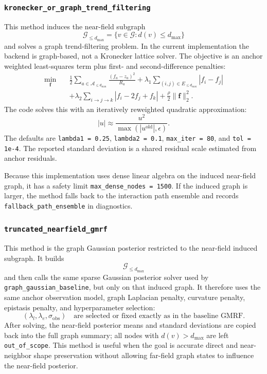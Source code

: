 \documentclass[11pt]{article}
\begin{document}
\subsubsection{\texttt{kronecker\_or\_graph\_trend\_filtering}}

This method induces the near-field subgraph
\[
  \mathcal{G}_{\le d_{\max}}
  =
  \{v\in\mathcal{G}:d(v)\le d_{\max}\}
\]
and solves a graph trend-filtering problem. In the current implementation the
backend is graph-based, not a Kronecker lattice solver. The objective is an
anchor weighted least-squares term plus first- and second-difference penalties:
\[
\begin{aligned}
  \min_{\bm f}\quad
  &
  \frac{1}{2}
  \sum_{a\in\mathcal{A}_{\le d_{\max}}}
  \frac{(f_a-z_a)^2}{R_a}
  +
  \lambda_1\sum_{(i,j)\in E_{\le d_{\max}}}|f_i-f_j|\\
  &+
  \lambda_2
  \sum_{i\to j\to k}
  |f_i-2f_j+f_k|
  +
  \frac{\rho}{2}\|\bm f\|_2^2.
\end{aligned}
\]
The code solves this with an iteratively reweighted quadratic approximation:
\[
  |u|\approx \frac{u^2}{\max(|u^{\mathrm{old}}|,\epsilon)}.
\]
The defaults are \texttt{lambda1 = 0.25}, \texttt{lambda2 = 0.1},
\texttt{max\_iter = 80}, and \texttt{tol = 1e-4}. The reported standard
deviation is a shared residual scale estimated from anchor residuals.

Because this implementation uses dense linear algebra on the induced near-field
graph, it has a safety limit \texttt{max\_dense\_nodes = 1500}. If the induced
graph is larger, the method falls back to the interaction path ensemble and
records \texttt{fallback\_path\_ensemble} in diagnostics.

\subsubsection{\texttt{truncated\_nearfield\_gmrf}}

This method is the graph Gaussian posterior restricted to the near-field
induced subgraph. It builds
\[
  \mathcal{G}_{\le d_{\max}}
\]
and then calls the same sparse Gaussian posterior solver used by
\texttt{graph\_gaussian\_baseline}, but only on that induced graph. It therefore
uses the same anchor observation model, graph Laplacian penalty, curvature
penalty, epistasis penalty, and hyperparameter selection:
\[
  (\lambda_l,\lambda_e,\sigma_{\mathrm{obs}})
  \quad\text{are selected or fixed exactly as in the baseline GMRF.}
\]
After solving, the near-field posterior means and standard deviations are
copied back into the full graph summary; all nodes with $d(v)>d_{\max}$ are
left \texttt{out\_of\_scope}. This method is useful when the goal is accurate
direct and near-neighbor shape preservation without allowing far-field graph
states to influence the near-field posterior.
\end{document}
